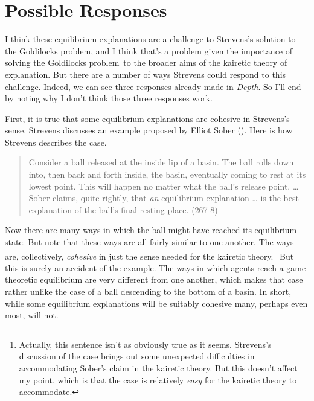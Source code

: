 \documentclass[
  11pt,
  letterpaper,
  DIV=11,
  numbers=noendperiod,
  twoside]{scrartcl}
\begin{document}
\section{Possible Responses}\label{possible-responses}

I think these equilibrium explanations are a challenge to Strevens's
solution to the Goldilocks problem, and I think that's a problem given
the importance of solving the Goldilocks problem~to the broader aims of
the kairetic theory of explanation. But there are a number of ways
Strevens could respond to this challenge. Indeed, we can see three
responses already made in \emph{Depth}. So I'll end by noting why I
don't think those three responses work.

First, it is true that some equilibrium explanations are cohesive in
Strevens's sense. Strevens discusses an example proposed by Elliot Sober
(). Here is how Strevens describes the
case.

\begin{quote}
Consider a ball released at the inside lip of a basin. The ball rolls
down into, then back and forth inside, the basin, eventually coming to
rest at its lowest point. This will happen no matter what the ball's
release point. \ldots{} Sober claims, quite rightly, that \emph{an}
equilibrium explanation \ldots{} is the best explanation of the ball's
final resting place. (267-8)
\end{quote}

Now there are many ways in which the ball might have reached its
equilibrium state. But note that these ways are all fairly similar to
one another. The ways are, collectively, \emph{cohesive} in just the
sense needed for the kairetic theory.\footnote{Actually, this sentence
  isn't as obviously true as it seems. Strevens's discussion of the case
  brings out some unexpected difficulties in accommodating Sober's claim
  in the kairetic theory. But this doesn't affect my point, which is
  that the case is relatively \emph{easy} for the kairetic theory to
  accommodate.} But this is surely an accident of the example. The ways
in which agents reach a game-theoretic equilibrium are very different
from one another, which makes that case rather unlike the case of a ball
descending to the bottom of a basin. In short, while some equilibrium
explanations will be suitably cohesive many, perhaps even most, will
not.
\end{document}
